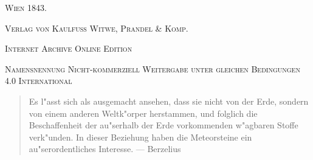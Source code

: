 \documentclass[a4paper, 11pt, oneside, polutonikogreek, german]{article}
\begin{document}
\begin{titlepage}
	\vspace{1\baselineskip}

	{\scshape Wien 1843.}
	
	{\scshape{Verlag von Kaulfuss Witwe, Prandel \& Komp.}}
	
	\vspace{0.5\baselineskip} %

    \scshape Internet Archive Online Edition  %
	
	{\scshape Namensnennung Nicht-kommerziell Weitergabe unter gleichen Bedingungen 4.0 International} %
\end{titlepage}
\setlength{\parskip}{1mm plus1mm minus1mm}
\clearpage
\pagestyle{fancy}
\fancyhf{}
\cfoot{\swabfamily {\thepage}}
\tableofcontents
\clearpage
\Large
\vspace*{\fill}
\begin{quote}
   Es l"asst sich als ausgemacht ansehen, dass sie nicht von der Erde, sondern von einem anderen Weltk"orper herstammen, und folglich die Beschaffenheit der au"serhalb der Erde vorkommenden w"agbaren Stoffe verk"unden. In dieser Beziehung haben die Meteorsteine ein au"serordentliches Interesse. --- Berzelius
\end{quote}
\vspace*{\fill}
\clearpage
\section*{}
\end{document}
